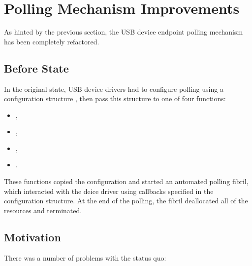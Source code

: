 \section{Polling Mechanism Improvements}

As hinted by the previous section, the USB device endpoint polling mechanism has
been completely refactored.


\subsection{Before State}

In the original state, USB device drivers had to configure polling using a
configuration structure , then pass this
structure to one of four functions:

\begin{itemize}
	\item {},
	\item {},
	\item {},
	\item {}.
\end{itemize}

These functions copied the configuration and started an automated polling
fibril, which interacted with the deice driver using callbacks specified in the
configuration structure. At the end of the polling, the fibril deallocated all
of the resources and terminated.


\subsection{Motivation}

There was a number of problems with the status quo:

